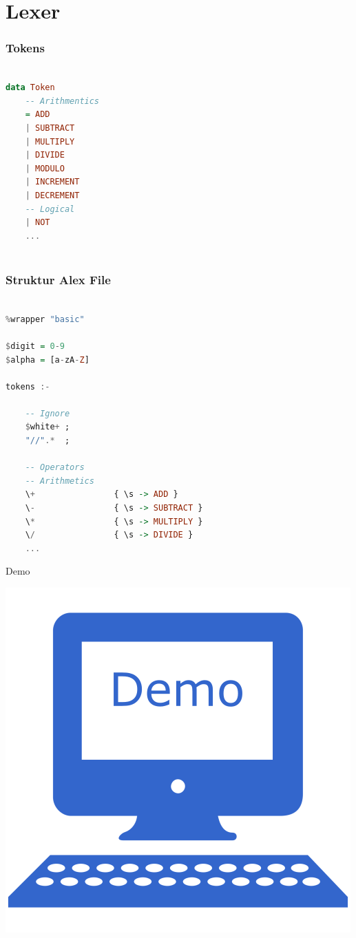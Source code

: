 \section{Lexer}

\begin{frame}[fragile]
	\frametitle{Tokens}
	\begin{lstlisting}[language=Haskell]
		
data Token
	-- Arithmentics
	= ADD
	| SUBTRACT
	| MULTIPLY
	| DIVIDE
	| MODULO
	| INCREMENT
	| DECREMENT
	-- Logical
	| NOT	
	...	
		
	\end{lstlisting}
\end{frame}

\begin{frame}[fragile]
	\frametitle{Struktur Alex File}
	\begin{lstlisting}[basicstyle=\tiny, language=Haskell]

%wrapper "basic"

$digit = 0-9
$alpha = [a-zA-Z]

tokens :-

	-- Ignore
	$white+ ; 
	"//".*  ;
	
	-- Operators
	-- Arithmetics
	\+                { \s -> ADD }
	\-                { \s -> SUBTRACT }
	\*                { \s -> MULTIPLY }
	\/                { \s -> DIVIDE }	
	...

	\end{lstlisting}
\end{frame}

\begin{frame}{Demo}

\begin{center}
	\includegraphics{images/lexer/demo.png}
\end{center}

\end{frame}